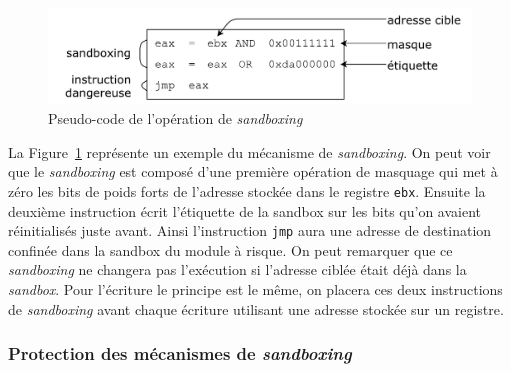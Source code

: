 \documentclass[11pt]{sdm}
\begin{document}
\begin{figure}

\centering
\includegraphics[scale=0.5]{images/algo_sandboxing.pdf}
\caption{Pseudo-code de l'opération de \textit{sandboxing}}
\label{fig:algo_sandbox}
\end{figure}

La Figure~\ref{fig:algo_sandbox} représente un exemple du mécanisme de \textit{sandboxing}. On peut voir que le \textit{sandboxing} est composé d'une première opération de masquage qui met à zéro les bits de poids forts de l'adresse stockée dans le registre \texttt{ebx}. Ensuite la deuxième instruction écrit l'étiquette de la sandbox sur les bits qu'on avaient réinitialisés juste avant. Ainsi l'instruction \texttt{jmp} aura une adresse de destination confinée dans la sandbox du module à risque. On peut remarquer que ce \textit{sandboxing} ne changera pas l'exécution si l'adresse ciblée était déjà dans la \textit{sandbox}. Pour l'écriture le principe est le même, on placera ces deux instructions de \textit{sandboxing} avant chaque écriture utilisant une adresse stockée sur un registre.

\subsubsection{Protection des mécanismes de \textit{sandboxing}}
\end{document}
